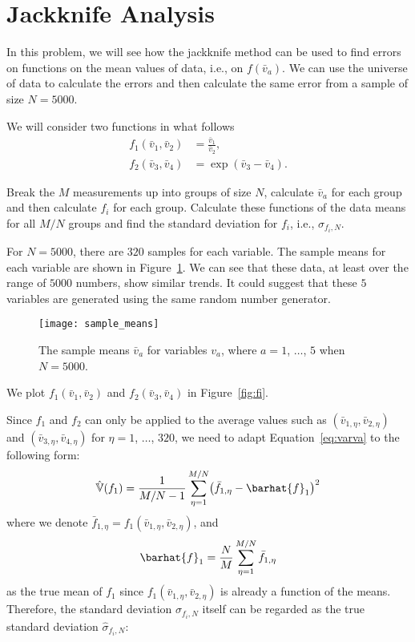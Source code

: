\section{Jackknife Analysis}

In this problem, we will see how the jackknife method can be used to find errors on functions
on the mean values of data, i.e., on \(f(\bar{v}_a)\).
We can use the universe of data to calculate
the errors and then calculate the same error from a sample of size \(N = 5000\).

We will consider two functions in what follows
%
\begin{align}
    f_1(\bar{v}_1, \bar{v}_2) & = \frac{ \bar{v}_1 }{ \bar{v}_2 }, \\
    f_2(\bar{v}_3, \bar{v}_4) & = \exp( \bar{v}_3 - \bar{v}_4 ).
\end{align}

 Break the \(M\) measurements up into groups of size \(N\), calculate
\(\bar{v}_a\) for each group and then calculate \(f_i\) for each group.
Calculate these functions of the data means for all \(M/N\) groups and find the
standard deviation for \(f_i\), i.e., \(\hat{\sigma}_{f_i,N}\).

\Answer{}
For \(N = 5000\), there are \(320\) samples for each variable.
The sample means for each variable are shown in Figure~\ref{fig:sample_means}.
We can see that these data, at least over the range of \(5000\) numbers,
show similar trends.
It could suggest that these \(5\) variables are generated using the same random
number generator.

\begin{figure}[h]
    \centering
    \texttt{[image: sample\_means]}
    \caption{The sample means \(\bar{v}_a\) for variables \(v_a\), where
        \(a = 1\), \(\ldots\), \(5\) when \(N = 5000\).}
    \label{fig:sample_means}
\end{figure}

We plot \(f_1(\bar{v}_1, \bar{v}_2)\) and \(f_2(\bar{v}_3, \bar{v}_4)\) in
Figure~\ref{fig:fi}.

Since \(f_1\) and \(f_2\) can only be applied to the average values such as
\((\bar{v}_{1,\eta}, \bar{v}_{2,\eta})\) and \((\bar{v}_{3,\eta}, \bar{v}_{4,\eta})\)
for \(\eta = 1\), \(\ldots\), \(320\), we need to adapt Equation~\eqref{eq:varva}
to the following form:
%
\begin{equation}
    \hat{\mathbb{V}}(f_1) = \frac{ 1 }{ M / N - 1 }
    \sum_{\eta=1}^{M/N} \bigl( \bar{f}_{1,\eta} - \barhat{f}_1 \bigr)^2
\end{equation}
%
where we denote \(\bar{f}_{1,\eta} = f_1(\bar{v}_{1,\eta}, \bar{v}_{2,\eta})\),
and
%
\begin{equation}
    \barhat{f}_1 = \frac{ N }{ M } \sum_{\eta=1}^{M/N} \bar{f}_{1,\eta}
\end{equation}
as the true mean of \(f_1\)
since \(f_1(\bar{v}_{1,\eta}, \bar{v}_{2,\eta})\) is already a function of the means.
Therefore, the standard deviation \(\sigma_{f_i,N}\) itself can be regarded
as the true standard deviation \(\hat{\sigma}_{f_i,N}\):

